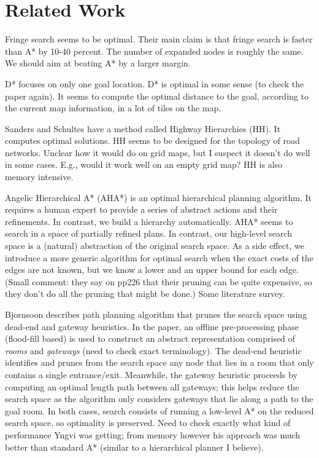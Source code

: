 \section{Related Work}
\label{ia-sec:relatedwork}

Fringe search seems to be optimal. Their main claim is that fringe search is faster than A* by 10-40 percent. The number of expanded nodes is roughly the same. We should aim at beating A* by a larger margin.
\par
D* focuses on only one goal location. D* is optimal in some sense (to check the paper again).
It seems to compute the optimal distance to the goal, according to the current map information,
in a lot of tiles on the map.
\par
Sanders and Schultes have a method called Highway Hierarchies (HH). It computes optimal solutions. 
HH seems to be designed for the topology of road networks. Unclear how it would do on grid maps, but I suspect it doesn't do well in some cases. E.g., would it work well on an empty grid map? HH is also memory intensive.
\par
Angelic Hierarchical A* (AHA*) is an optimal hierarchical planning algorithm.
It requires a human expert to provide a series of abstract actions and their refinements.
In contrast, we build a hierarchy automatically.
AHA* seems to search in a space of partially refined plans. 
In contrast, our high-level search space is a (natural) abstraction of the original search space.
As a side effect, we introduce a more generic algorithm for optimal search when the exact costs of the edges are not known, but we know a lower and an upper bound for each edge.
(Small comment: they say on pp226 that their pruning can be quite expensive, so they don't do all the pruning that might be done.)
Some literature survey.
\par
Bjornsoon describes path planning algorithm that prunes the search space using dead-end and gateway heuristics. 
In the paper, an offline pre-processing phase (flood-fill based) is used to construct an abstract representation comprised of \emph{rooms} and \emph{gateways} (need to check exact terminology). 
The dead-end heuristic identifies and prunes from the search space any node that lies in a room that only contains a single entrance/exit. 
Meanwhile, the gateway heuristic proceeds by computing an optimal length path between all gateways; this helps reduce the search space as the algorithm only considers gateways that lie along a path to the goal room.  
In both cases, search consists of running a low-level A* on the reduced search space, so optimality is preserved.
Need to check exactly what kind of performance Yngvi was getting; from memory however his approach was much better than standard A* (similar to a hierarchical planner I believe).

